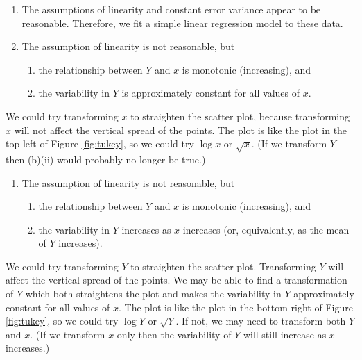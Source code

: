 \documentclass[
  british,
  11pt,
  openany, a4paper]{book}
\providecommand{\tightlist}{%
  \setlength{\itemsep}{0pt}\setlength{\parskip}{0pt}}
\begin{document}
\begin{enumerate}
\def\labelenumi{\alph{enumi}.}
\tightlist
\item
  The assumptions of linearity and constant error variance appear to be reasonable. Therefore, we fit a simple linear regression model to these data.
\item
  The assumption of linearity is not reasonable, but

  \begin{enumerate}
  \def\labelenumii{\roman{enumii}.}
  \tightlist
  \item
    the relationship between \(Y\) and \(x\) is monotonic (increasing), and
  \item
    the variability in \(Y\) is approximately constant for all values of \(x\).
  \end{enumerate}
\end{enumerate}

We could try transforming \(x\) to straighten the scatter plot, because transforming \(x\) will not affect the vertical spread of the points. The plot is like the plot in the top left of Figure \ref{fig:tukey}, so we could try \(\log x\) or \(\sqrt{x}\). (If we transform \(Y\) then (b)(ii) would probably no longer be true.)

\begin{enumerate}
\def\labelenumi{\alph{enumi}.}
\setcounter{enumi}{2}
\tightlist
\item
  The assumption of linearity is not reasonable, but

  \begin{enumerate}
  \def\labelenumii{\roman{enumii}.}
  \tightlist
  \item
    the relationship between \(Y\) and \(x\) is monotonic (increasing), and
  \item
    the variability in \(Y\) increases as \(x\) increases (or, equivalently, as the mean of \(Y\) increases).
  \end{enumerate}
\end{enumerate}

We could try transforming \(Y\) to straighten the scatter plot. Transforming \(Y\) will affect the vertical spread of the points. We may be able to find a transformation of \(Y\) which both straightens the plot and makes the variability in \(Y\) approximately constant for all values of \(x\). The plot is like the plot in the bottom right of Figure \ref{fig:tukey}, so we could try \(\log Y\) or \(\sqrt{Y}\). If not, we may need to transform both \(Y\) and \(x\). (If we transform \(x\) only then the variability of \(Y\) will still increase as \(x\) increases.)
\end{document}
